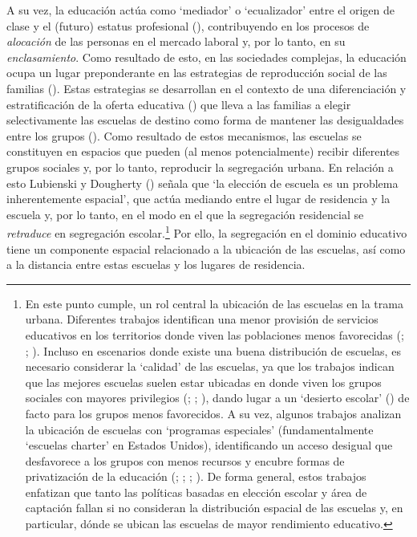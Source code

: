 \documentclass[
  spanish,
  a4paper,%
  chapterprefix=true,%
  DIV=calc,%
  twoside]{scrbook}%
\begin{document}
A su vez, la educación actúa como `mediador' o `ecualizador' entre el
origen de clase y el (futuro) estatus profesional (),
contribuyendo en los procesos de \emph{alocación} de las personas en el
mercado laboral y, por lo tanto, en su \emph{enclasamiento}. Como resultado
de esto, en las sociedades complejas, la educación ocupa un lugar
preponderante en las estrategias de reproducción social de las familias
(). Estas
estrategias se desarrollan en el contexto de una diferenciación y
estratificación de la oferta educativa () que lleva a las
familias a elegir selectivamente las escuelas de destino como forma de
mantener las desigualdades entre los grupos (). Como resultado
de estos mecanismos, las escuelas se constituyen en espacios que pueden
(al menos potencialmente) recibir diferentes grupos sociales y, por lo
tanto, reproducir la segregación urbana. En relación a esto
Lubienski y Dougherty () señala que `la elección de escuela es un
problema inherentemente espacial', que actúa mediando entre el lugar de
residencia y la escuela y, por lo tanto, en el modo en el que la
segregación residencial se \emph{retraduce} en segregación
escolar.\footnote{En este punto cumple, un rol central la
  ubicación de las escuelas en la trama urbana. Diferentes trabajos
  identifican una menor provisión de servicios educativos en los
  territorios donde viven las poblaciones menos favorecidas
  (; ; ). Incluso en escenarios donde
  existe una buena distribución de escuelas, es necesario considerar
  la `calidad' de las escuelas, ya que los trabajos indican que las
  mejores escuelas suelen estar ubicadas en donde viven los grupos
  sociales con mayores privilegios (; ; ), dando lugar a un `desierto escolar' () de
  facto para los grupos menos favorecidos. A su vez, algunos trabajos
  analizan la ubicación de escuelas con `programas especiales'
  (fundamentalmente `escuelas charter' en Estados Unidos),
  identificando un acceso desigual que desfavorece a los grupos con
  menos recursos y encubre formas de privatización de la educación
  (; ; ; ). De forma
  general, estos trabajos enfatizan que tanto las políticas basadas en
  elección escolar y área de captación fallan si no consideran la
  distribución espacial de las escuelas y, en particular, dónde se
  ubican las escuelas de mayor rendimiento educativo.} Por ello, la segregación en el
dominio educativo tiene un componente espacial relacionado a la
ubicación de las escuelas, así como a la distancia entre estas escuelas
y los lugares de residencia.
\end{document}
